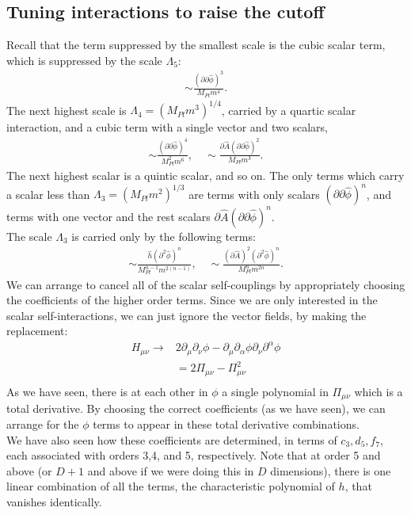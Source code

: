 \documentclass{book}
\theoremstyle{definition}
\newcommand{\p}{\partial}
\newcommand{\nn}{\nonumber}
\newcommand{\al}{\alpha}
\newcommand{\f}[2]{\frac{#1}{#2}}
\begin{document}
\subsection{Tuning interactions to raise the cutoff}


Recall that the term suppressed by the smallest scale is the cubic scalar term, which is suppressed by the scale $\Lambda_5$:
\begin{align}
\sim \f{(\p\p \hat{\phi})^3}{M_{Pl}m^4}.
\end{align}
The next highest scale is $\Lambda_4 = (M_{Pl}m^3)^{1/4}$, carried by a quartic scalar interaction, and a cubic term with a single vector and two scalars,
\begin{align}
\sim \f{(\p \p \hat{\phi})^4}{M_{Pl}^2m^6}, \quad \sim \f{\p \hat{A} (\p \p \hat{\phi})^2}{M_{Pl}m^3}.
\end{align}
The next highest scalar is a quintic scalar, and so on. The only terms which carry a scalar less than $\Lambda_3 = (M_{Pl}m^2)^{1/3}$ are terms with only scalars $(\p \p \hat{\phi})^n$, and terms with one vector and the rest scalars $\p \hat{A}(\p \p \hat{\phi})^n$.\\

The scale $\Lambda_3$ is carried only by the following terms:
\begin{align}
\sim \f{\hat{h} (\p^2 \hat{\phi})^n }{M_{Pl}^{n-1} m^{2(n-1)}}, \quad \sim \f{(\p \hat{A})^2 (\p^2 \hat{\phi})^n}{ M_{Pl}^n m^{2n}}.
\end{align}
We can arrange to cancel all of the scalar self-couplings by appropriately choosing the coefficients of the higher order terms. Since we are only interested in the scalar self-interactions, we can just ignore the vector fields, by making the replacement:
\begin{align}
H_{\mu\nu} \to &2\p_\mu \p_\nu \phi - \p_\mu \p_\al \phi \p_\nu \p^\al \phi\nn\\
&=2\Pi_{\mu\nu} - \Pi^2_{\mu\nu} \nn\\
\end{align}
As we have seen, there is at each other in $\phi$ a single polynomial in $\Pi_{\mu\nu}$ which is a total derivative. By choosing the correct coefficients (as we have seen), we can arrange for the $\phi$ terms to appear in these total derivative combinations. \\

We have also seen how these coefficients are determined, in terms of $c_3,d_5,f_7$, each associated with orders 3,4, and 5, respectively. Note that at order 5 and above (or $D+1$ and above if we were doing this in $D$ dimensions), there is one linear combination of all the terms, the characteristic polynomial of $h$, that vanishes identically. \\
\end{document}
